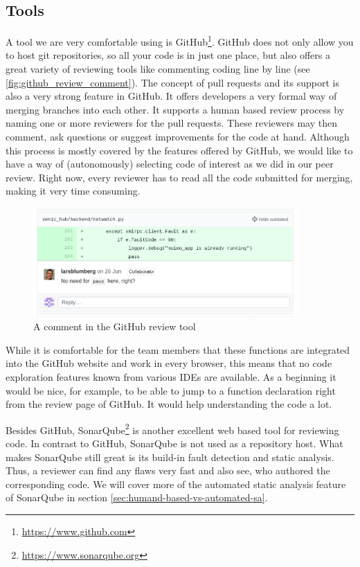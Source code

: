 \documentclass{scrreprt}
\begin{document}
\subsection{Tools}

A tool we are very comfortable using is GitHub\footnote{\url{https://www.github.com}}. GitHub does not only allow you to host git repositories, so all your code is in just one place, but also offers a great variety of reviewing tools like commenting coding line by line (see \vref{fig:github_review_comment}). The concept of pull requests and its support is also a very strong feature in GitHub. It offers developers a very formal way of merging branches into each other. It supports a human based review process by naming one or more reviewers for the pull requests. These reviewers may then comment, ask questions or suggest improvements for the code at hand. Although this process is mostly covered by the features offered by GitHub, we would like to have a way of (autonomously) selecting code of interest as we did in our peer review. Right now, every reviewer has to read all the code submitted for merging, making it very time consuming.

\begin{figure}[h]
	\centering
	\includegraphics[width=0.9\textwidth]{img/github_review_comment}
	\caption[GitHub Review Comment]{A comment in the GitHub review tool}
	\label{fig:github_review_comment}
\end{figure}

While it is comfortable for the team members that these functions are integrated into the GitHub website and work in every browser, this means that no code exploration features known from various IDEs are available. As a beginning it would be nice, for example, to be able to jump to a function declaration right from the review page of GitHub. It would help understanding the code a lot.

Besides GitHub, SonarQube\footnote{\url{https://www.sonarqube.org}} is another excellent web based tool for reviewing code. In contrast to GitHub, SonarQube is not used as a repository host. What makes SonarQube still great is its build-in fault detection and static analysis. Thus, a reviewer can find any flaws very fast and also see, who authored the corresponding code. We will cover more of the automated static analysis feature of SonarQube in section \ref{sec:humand-based-vs-automated-sa}.
\end{document}
